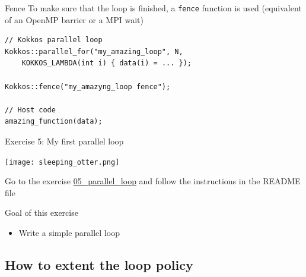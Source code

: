 \documentclass[aspectratio=169]{beamer}
\begin{document}

\begin{frame}[fragile]{Fence}
     To make sure that the loop is finished, a \texttt{fence} function is used (equivalent of an OpenMP barrier or a MPI wait)

    \begin{verbatim}
// Kokkos parallel loop
Kokkos::parallel_for("my_amazing_loop", N,
    KOKKOS_LAMBDA(int i) { data(i) = ... });

Kokkos::fence("my_amazyng_loop fence");

// Host code
amazing_function(data);
    \end{verbatim}
\end{frame}


\begin{frame}{Exercise 5: My first parallel loop}
    \begin{center}
        \texttt{[image: sleeping\_otter.png]}
    \end{center}

    Go to the exercise \href{https://github.com/CExA-project/cexa-kokkos-tutorials/tree/main/exercises/05_parallel_loop}{05\_parallel\_loop} and follow the instructions in the README file

    \begin{block}{Goal of this exercise}
        \begin{itemize}
            \item Write a simple parallel loop
        \end{itemize}
    \end{block}
\end{frame}


\subsection[Extended loop policy]{How to extent the loop policy}

\end{document}
